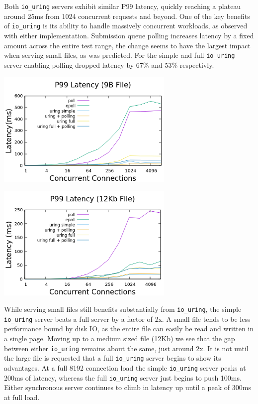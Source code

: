 \documentclass[conference]{IEEEtran}{article}
\begin{document}
Both \texttt{io\_uring} servers exhibit similar P99 latency, quickly reaching a plateau around 25ms from 1024 concurrent requests and beyond. One of the key benefits of \texttt{io\_uring} is its ability to handle massively concurrent workloads, as observed with either implementation. Submission queue polling increases latency by a fixed amount across the entire test range, the change seems to have the largest impact when serving small files, as was predicted. For the simple and full \texttt{io\_uring} server enabling polling dropped latency by 67\% and 53\% respectivly.

\begin{center}
\includegraphics[width=3.35in]{small_latency.png}
\end{center}

\begin{center}
\includegraphics[width=3.35in]{./med_latency.png}
\end{center}

While serving small files still benefits substantially from \texttt{io\_uring}, the simple \texttt{io\_uring} server beats a full server by a factor of 2x. A small file tends to be less performance bound by disk IO, as the entire file can easily be read and written in a single page. Moving up to a medium sized file (12Kb) we see that the gap between either \texttt{io\_uring} remains about the same, just around 2x. It is not until the large file is requested that a full \texttt{io\_uring} server begins to show its advantages. At a full 8192 connection load the simple \texttt{io\_uring} server peaks at 200ms of latency, whereas the full \texttt{io\_uring} server just begins to push 100ms. Either synchronous server continues to climb in latency up until a peak of 300ms at full load.
\end{document}
